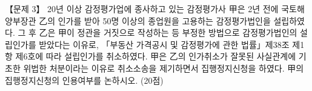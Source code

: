\begin{longquestion}{【문제 3】}
20년 이상 감정평가업에 종사하고 있는 감정평가사 甲은 2년 전에 국토해양부장관 乙의 인가를 받아 50명 이상의 종업원을 고용하는 감정평가법인을 설립하였다. 그 후 乙은 甲이 정관을 거짓으로 작성하는 등 부정한 방법으로 감정평가법인의 설립인가를 받았다는 이유로, 「부동산 가격공시 및 감정평가에 관한 법률」제38조 제1항 제6호에 따라 설립인가를 취소하였다. 甲은 乙의 인가취소가 잘못된 사실관계에 기초한 위법한 처분이라는 이유로 취소소송을 제기하면서 집행정지신청을 하였다. 甲의 집행정지신청의 인용여부를 논하시오. (20점) \par
\end{longquestion}
